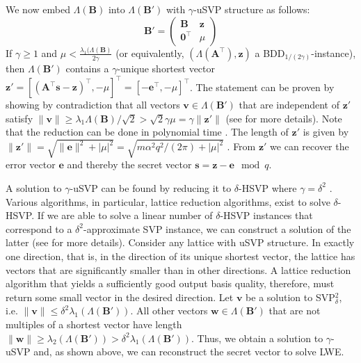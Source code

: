We now embed $\Lambda(\mathbf{B})$ into $\Lambda(\mathbf{B}')$ with $\gamma$-uSVP structure as follows: %
\begin{equation}
  \mathbf{B}' = \begin{pmatrix}
    \mathbf{B}           & \mathbf{z} \\
    \mathbf{0}^\intercal & \mu
  \end{pmatrix}
\end{equation}
If $\gamma \geq 1$ and $\mu < \frac{\lambda_1(\Lambda(\mathbf{B})}{2\gamma}$ (or equivalently, $(\Lambda(\mathbf{A}^\intercal), \mathbf{z})$ a BDD$_{1/(2\gamma)}$-instance), then $\Lambda(\mathbf{B}')$ contains a $\gamma$-unique shortest vector $\mathbf{z}' = \left[(\mathbf{A}^\intercal\mathbf{s} - \mathbf{z})^\intercal, -\mu\right]^\intercal = \left[-\mathbf{e}^\intercal, -\mu\right]^\intercal$.
The statement can be proven by showing by contradiction that all vectors $\mathbf{v} \in \Lambda(\mathbf{B}')$ that are independent of $\mathbf{z}'$ satisfy $\| \mathbf{v}\| \geq \lambda_1{\Lambda(\mathbf{B})}/\sqrt{2} > \sqrt{2}\gamma \mu = \gamma \|\mathbf{z}'\|$ (see \cite[Section~4]{LM09} for more details). Note that the reduction can be done in polynomial time \cite[Theorem~4.1]{LM09}. %
The length of $\mathbf{z}'$ is given by $\|\mathbf{z}'\| = \sqrt{\|\mathbf{e}\|^2 + | \mu |^2} = \sqrt{m\alpha^2 q^2/(2\pi) + | \mu |^2}$ \cite{BBGS19}. From $\mathbf{z}'$ we can recover the error vector $\mathbf{e}$ and thereby the secret vector $\mathbf{s} = \mathbf{z} - \mathbf{e} \mod q$.

A solution to $\gamma$-uSVP can be found by reducing it to $\delta$-HSVP where $\gamma = \delta^2$ \cite{APS15}. Various algorithms, in particular, lattice reduction algorithms, exist to solve $\delta$-HSVP. If we are able to solve a linear number of $\delta$-HSVP instances that correspond to a $\delta^2$-approximate SVP instance, we can construct a solution of the latter (see \cite[Section~1.2.21]{Lov87} for more details).
Consider any lattice with uSVP structure. In exactly one direction, that is, in the direction of its unique shortest vector, the lattice has vectors that are significantly smaller than in other directions. A lattice reduction algorithm that yields a sufficiently good output basis quality, therefore, must return some small vector in the desired direction.
Let $\mathbf{v}$ be a solution to SVP$_\delta^2$, i.e. $\|\mathbf{v}\| \leq \delta^2 \lambda_1(\Lambda(\mathbf{B}'))$. All other vectors $\mathbf{w}\in \Lambda(\mathbf{B}')$ that are not multiples of a shortest vector have length $\|\mathbf{w}\| \geq \lambda_2(\Lambda(\mathbf{B}')) > \delta^2\lambda_1(\Lambda(\mathbf{B}'))$. Thus, we obtain a solution to $\gamma$-uSVP and, as shown above, we can reconstruct the secret vector to solve LWE.

